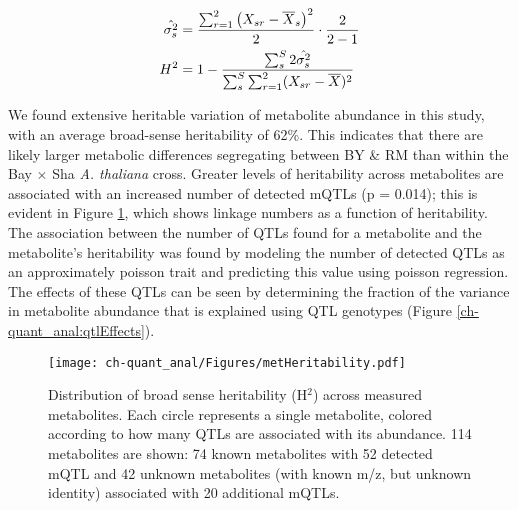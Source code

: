 \large{
\begin{align}
\hat{\sigma^{2}_{s}} &= \frac{\sum_{r = 1}^{2}\left(X_{sr} - \overline{X}_{s}\right)^2}{2} \cdot \frac{2}{2 - 1}\notag\\
H^{2} &= 1 -  \frac{\sum_{s}^{S}2\hat{\sigma^{2}_{s}}}{\sum_{s}^{S}\sum_{r = 1}^{2}(X_{sr} - \overline{X})^2}\label{heriteq}
\end{align}
}

We found extensive heritable variation of metabolite abundance in this study, with an average broad-sense heritability of 62\%.  This indicates that there are likely larger metabolic differences segregating between BY \& RM than within the Bay $\times$ Sha \textit{A. thaliana} cross. Greater levels of heritability across metabolites are associated with an increased number of detected mQTLs (p = 0.014); this is evident in Figure \ref{ch-quant_anal:metHeritability}, which shows linkage numbers as a function of heritability. The association between the number of QTLs found for a metabolite and the metabolite's heritability was found by modeling the number of detected QTLs as an approximately poisson trait and predicting this value using poisson regression. The effects of these QTLs can be seen by determining the fraction of the variance in metabolite abundance that is explained using QTL genotypes (Figure \ref{ch-quant_anal:qtlEffects}).  

\begin{figure}[h!]
\begin{center}
\texttt{[image: ch-quant\_anal/Figures/metHeritability.pdf]}
\caption[Distribution of broad sense heritability (H$^{2}$) across measured metabolites]{Distribution of broad sense heritability (H$^{2}$) across measured metabolites. Each circle represents a single metabolite, colored according to how many QTLs are associated with its abundance.  114 metabolites are shown: 74 known metabolites with 52 detected mQTL and 42 unknown metabolites (with known m/z, but unknown identity) associated with 20 additional mQTLs.}
\label{ch-quant_anal:metHeritability}
\end{center}
\end{figure}

